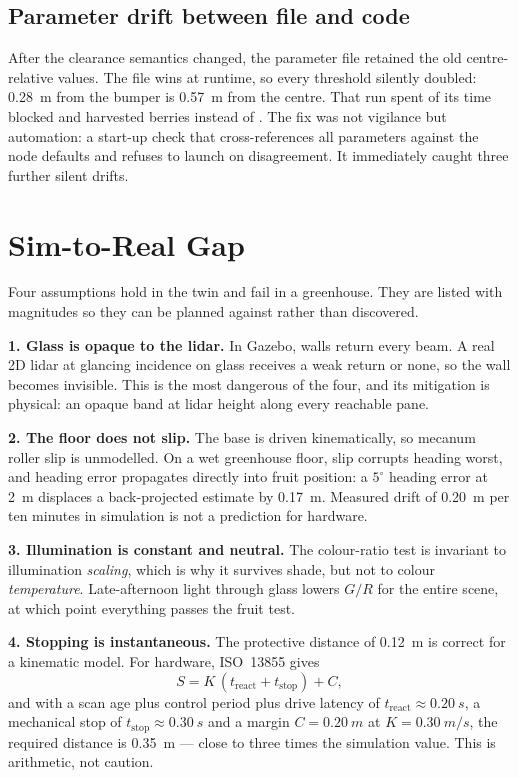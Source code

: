 \documentclass[conference]{IEEEtran}
\begin{document}
\subsection{Parameter drift between file and code}

After the clearance semantics changed, the parameter file retained the old
centre-relative values. The file wins at runtime, so every threshold silently
doubled: \SI{0.28}{m} from the bumper is \SI{0.57}{m} from the centre. That
run spent  of its time blocked and harvested 
berries instead of . The fix was not vigilance but automation:
a start-up check that cross-references all  parameters against
the node defaults and refuses to launch on disagreement. It immediately caught
three further silent drifts.

\section{Sim-to-Real Gap}
\label{sec:sim2real}

Four assumptions hold in the twin and fail in a greenhouse. They are listed
with magnitudes so they can be planned against rather than discovered.

\textbf{1. Glass is opaque to the lidar.} In Gazebo, walls return every beam.
A real 2D lidar at glancing incidence on glass receives a weak return or none,
so the wall becomes invisible. This is the most dangerous of the four, and its
mitigation is physical: an opaque band at lidar height along every reachable
pane.

\textbf{2. The floor does not slip.} The base is driven kinematically, so
mecanum roller slip is unmodelled. On a wet greenhouse floor, slip corrupts
heading worst, and heading error propagates directly into fruit position: a
$5^\circ$ heading error at \SI{2}{m} displaces a back-projected estimate by
\SI{0.17}{m}. Measured drift of \SI{0.20}{m} per ten minutes in simulation is
not a prediction for hardware.

\textbf{3. Illumination is constant and neutral.} The colour-ratio test is
invariant to illumination \emph{scaling}, which is why it survives shade, but
not to colour \emph{temperature}. Late-afternoon light through glass lowers
$G/R$ for the entire scene, at which point everything passes the fruit test.

\textbf{4. Stopping is instantaneous.} The protective distance of
\SI{0.12}{m} is correct for a kinematic model. For hardware, ISO~13855 gives
\begin{equation}
S = K\,(t_{\text{react}} + t_{\text{stop}}) + C ,
\label{eq:iso13855}
\end{equation}
and with a scan age plus control period plus drive latency of
$t_{\text{react}} \approx \SI{0.20}{s}$, a mechanical stop of
$t_{\text{stop}} \approx \SI{0.30}{s}$ and a margin $C = \SI{0.20}{m}$ at
$K = \SI{0.30}{m/s}$, the required distance is \SI{0.35}{m} --- close to three
times the simulation value. This is arithmetic, not caution.
\end{document}
